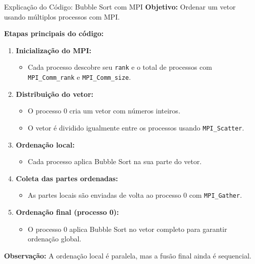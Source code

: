 \documentclass{beamer}
\begin{document}
\begin{frame}{Explicação do Código: Bubble Sort com MPI}
\textbf{Objetivo:} Ordenar um vetor usando múltiplos processos com MPI.

\vspace{1em}
\textbf{Etapas principais do código:}

\begin{enumerate}
    \item \textbf{Inicialização do MPI:}
    \begin{itemize}
        \item Cada processo descobre seu \texttt{rank} e o total de processos com \texttt{MPI\_Comm\_rank} e \texttt{MPI\_Comm\_size}.
    \end{itemize}

    \item \textbf{Distribuição do vetor:}
    \begin{itemize}
        \item O processo 0 cria um vetor com números inteiros.
        \item O vetor é dividido igualmente entre os processos usando \texttt{MPI\_Scatter}.
    \end{itemize}

    \item \textbf{Ordenação local:}
    \begin{itemize}
        \item Cada processo aplica Bubble Sort na sua parte do vetor.
    \end{itemize}

    \item \textbf{Coleta das partes ordenadas:}
    \begin{itemize}
        \item As partes locais são enviadas de volta ao processo 0 com \texttt{MPI\_Gather}.
    \end{itemize}

    \item \textbf{Ordenação final (processo 0):}
    \begin{itemize}
        \item O processo 0 aplica Bubble Sort no vetor completo para garantir ordenação global.
    \end{itemize}
\end{enumerate}

\vspace{0.5em}
\textbf{Observação:} A ordenação local é paralela, mas a fusão final ainda é sequencial.
\end{frame}
\end{document}
